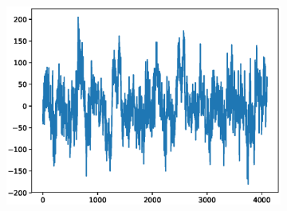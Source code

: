 \documentclass[12pt]{article}
\begin{document}
\begin{figure}
\begin{subfigure}{.25\textwidth}
\end{subfigure}%
\begin{subfigure}{.25\textwidth}
  \centering
  \includegraphics[width=.8\linewidth]{figures/signals/A/Z035.eps}
\end{subfigure}


\end{figure}
\end{document}
